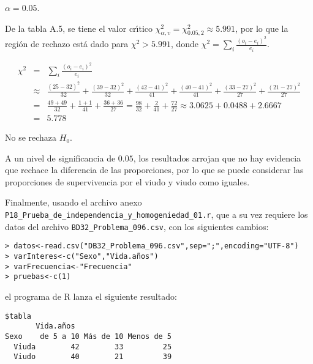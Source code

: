 \begin{solucion}
 \begin{significancia}
  $\alpha = 0.05$.
 \end{significancia}

 \begin{region}
  De la tabla A.5, se tiene el valor cr\'{\i}tico
  $\chi^2_{\alpha,v} = \chi^2_{0.05,2} \approx 5.991$,
  por lo que la regi\'on de rechazo est\'a dado
  para $\chi^2 > 5.991$, donde
  $\chi^2 = \sum_{i} \frac{\left( o_i - e_i \right)^2}{e_i}$.
 \end{region}

 \begin{estadistico}
  \begin{eqnarray*}
   \chi^2 & = & \sum_{i} \frac{\left( o_i - e_i \right)^2}{e_i} \\
   & \approx & \frac{(25 - 32)^2}{32} + \frac{(39 - 32)^2}{32} +
   \frac{(42 - 41)^2}{41} + \frac{(40 - 41)^2}{41} + 
   \frac{(33 - 27)^2}{27} + \frac{(21 - 27)^2}{27} \\
   & = & \frac{49 + 49}{32} + \frac{1 + 1}{41} + 
   \frac{36 + 36}{27} = \frac{98}{32} + \frac{2}{41} + \frac{72}{27}
   \approx 3.0625 + 0.0488 + 2.6667 \\
   & = & 5.778
  \end{eqnarray*}
 \end{estadistico}

 \begin{decision}
  No se rechaza $H_0$.
 \end{decision}

 \begin{conclusion}
  A un nivel de significancia de $0.05$, los resultados arrojan
  que no hay evidencia que rechace la diferencia de las proporciones,
  por lo que se puede considerar las proporciones de supervivencia por
  el viudo y viudo como iguales.
 \end{conclusion}

 Finalmente, usando el archivo anexo
 \texttt{P18\_Prueba\_de\_independencia\_y\_homogeniedad\_01.r},
 que a su vez requiere los datos del archivo
 \texttt{BD32\_Problema\_096.csv}, con los siguientes cambios:
 \begin{verbatim}
> datos<-read.csv("DB32_Problema_096.csv",sep=";",encoding="UTF-8")
> varInteres<-c("Sexo","Vida.años")
> varFrecuencia<-"Frecuencia"
> pruebas<-c(1)
 \end{verbatim}
 \vspace{-0.5cm}
 el programa de R lanza el siguiente resultado:
 \begin{verbatim}
$tabla
       Vida.años
Sexo    de 5 a 10 Más de 10 Menos de 5
  Viuda        42        33         25
  Viudo        40        21         39


\end{verbatim}
\end{solucion}

